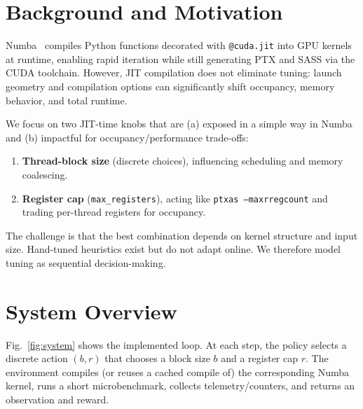 \documentclass[journal,letterpaper]{IEEEtran}
\begin{document}
\section{Background and Motivation}
\label{sec:background}

Numba~\cite{numba2015} compiles Python functions decorated with \texttt{@cuda.jit} into GPU kernels at runtime, enabling rapid iteration while still generating PTX and SASS via the CUDA toolchain.
However, JIT compilation does not eliminate tuning: launch geometry and compilation options can significantly shift occupancy, memory behavior, and total runtime.

We focus on two JIT-time knobs that are (a) exposed in a simple way in Numba and (b) impactful for occupancy/performance trade-offs:
\begin{enumerate}
\item \textbf{Thread-block size} (discrete choices), influencing scheduling and memory coalescing.
\item \textbf{Register cap} (\texttt{max\_registers}), acting like \texttt{ptxas --maxrregcount} and trading per-thread registers for occupancy.
\end{enumerate}

The challenge is that the best combination depends on kernel structure and input size.
Hand-tuned heuristics exist but do not adapt online.
We therefore model tuning as sequential decision-making.

\section{System Overview}
\label{sec:system}

Fig.~\ref{fig:system} shows the implemented loop.
At each step, the policy selects a discrete action $(b, r)$ that chooses a block size $b$ and a register cap $r$.
The environment compiles (or reuses a cached compile of) the corresponding Numba kernel, runs a short microbenchmark, collects telemetry/counters, and returns an observation and reward.
\end{document}
